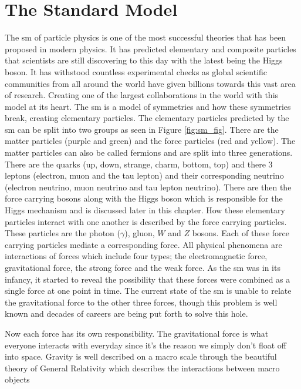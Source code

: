 \section{The Standard Model}
\label{sect:standard_model}

The \gls{sm} of particle physics is one of the most successful theories that has been proposed in 
modern physics. It has predicted elementary and composite particles that scientists are still discovering 
to this day with the latest being the Higgs boson. It has withstood countless experimental checks as global
scientific communities from all around the world have given billions towards this vast area of research. Creating 
one of the largest collaborations in the world with this model at its heart. The \gls{sm} is a model 
of symmetries and how these symmetries break, creating elementary particles. The elementary particles predicted by 
the \gls{sm} can be split into two groups as seen in Figure \ref{fig:sm_fig}. There are the matter particles (purple and green) 
and the force particles (red and yellow). The matter particles can also be called fermions and are split into three 
generations. There are the quarks (up, down, strange, charm, bottom, top) and there 3 leptons 
(electron, muon and the tau lepton) and their corresponding neutrino (electron neutrino, muon neutrino and tau lepton neutrino). 
There are then the force carrying bosons along with the Higgs boson which is responsible for the Higgs mechanism and is discussed
later in this chapter. How these elementary particles interact with one another is described by the force carrying particles. 
These particles are the photon ($\gamma$), gluon, $W$ and $Z$ bosons. Each of these force carrying particles mediate a corresponding force. 
All physical phenomena are interactions of forces which include four types; the electromagnetic force, gravitational force, 
the strong force and the weak force. As the \gls{sm} was in its infancy, it started to reveal the possibility that 
these forces were combined as a single force at one point in time. The current state of the \gls{sm} is unable to
relate the gravitational force to the other three forces, though this problem is well known and decades of careers are 
being put forth to solve this hole. 
\par
Now each force has its own responsibility. The gravitational force is what everyone interacts with everyday
since it's the reason we simply don't float off into space. Gravity is well described on a macro scale through 
the beautiful theory of General Relativity which describes the interactions between macro objects 

